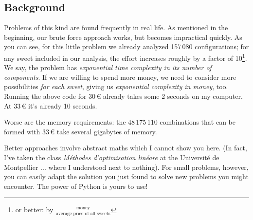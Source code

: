 \documentclass[
	english,
	fontsize=10pt,
	parskip=half,
	titlepage=true,
	DIV=12
]{scrartcl}
\begin{document}
\subsection*{Background}
Problems of this kind are found frequently in real life. As mentioned in the beginning, our brute force approach works, but becomes impractical quickly. As you can see, for this little problem we already analyzed 157\,080 configurations; for any sweet included in our analysis, the effort increases roughly by a factor of 10\footnote{or better: by $\frac{\text{money}}{\text{average price of all sweets}}$}. We say, the problem has \emph{exponential time complexity in its number of components}. If we are willing to spend more money, we need to consider more possibilities \emph{for each sweet}, giving us \emph{exponential complexity in money}, too. Running the above code for 30\,€ already takes some 2 seconds on my computer. At 33\,€ it's already 10 seconds.

Worse are the memory requirements: the 48\,175\,110 combinations that can be formed with 33\,€ take several gigabytes of memory.

Better approaches involve abstract maths which I cannot show you here. (In fact, I've taken the class \emph{Méthodes d'optimisation linéare} at the Université de Montpellier ... where I understood next to nothing). For small problems, however, you can easily adapt the solution you just found to solve new problems you might encounter. The power of Python is yours to use!
\end{document}
